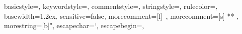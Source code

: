 \usepackage{listings}
\usepackage{xcolor}
\newcommand\macoutput[1]{{\tt [Macaulay2 output o#1]}}%
{
basicstyle={\ttfamily},
keywordstyle={\color{token function}},%
commentstyle={\color{token comment}},
stringstyle={\color{token string}},
rulecolor=\color{maccolor},
basewidth={1.2ex}, %
sensitive=false,
morecomment=[l]{--},
morecomment=[s]{-*}{*-},
morestring=[b]",
escapechar={`},
escapebegin={\rmfamily},
}
